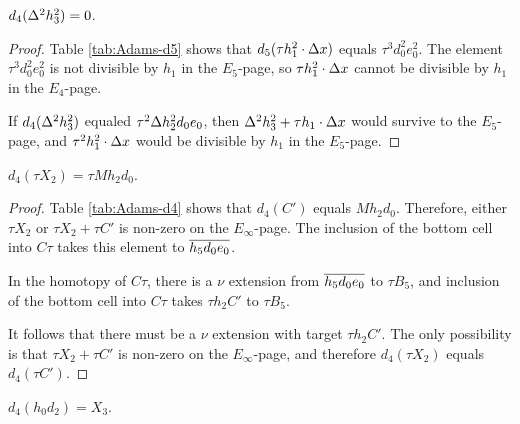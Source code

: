 \begin{lemma}
\label{lem:d4-D^2h3^2}
$d_4(\Delta^2 h_3^2) = 0$.
\end{lemma}

\begin{proof}
Table \ref{tab:Adams-d5} shows that 
$d_5(\tau h_1^2 \cdot \Delta x)$ equals
$\tau^3 d_0^2 e_0^2$.  
The element $\tau^3 d_0^2 e_0^2$ is not divisible by
$h_1$ in the $E_5$-page, so
$\tau h_1^2 \cdot \Delta x$ 
cannot be divisible by $h_1$ in the $E_4$-page.

If $d_4(\Delta^2 h_3^2)$ equaled 
$\tau^2 \Delta h_2^2 d_0 e_0$, then
$\Delta^2 h_3^2 + \tau h_1 \cdot \Delta x$ would survive to the $E_5$-page, 
and $\tau^2 h_1^2 \cdot \Delta x$ would be divisible by $h_1$ in the $E_5$-page.
\end{proof}

\begin{lemma}
\label{lem:d4-tX2}
$d_4(\tau X_2) = \tau M h_2 d_0$.
\end{lemma}

\begin{proof}
Table \ref{tab:Adams-d4} shows that $d_4(C')$ equals $M h_2 d_0$.
Therefore, either $\tau X_2$ or $\tau X_2 + \tau C'$ is non-zero on the
$E_\infty$-page.  The inclusion of the bottom cell into $C\tau$
takes this element to $\overline{h_5 d_0 e_0}$.

In the homotopy of $C\tau$, there is a $\nu$ extension from
$\overline{h_5 d_0 e_0}$ to $\tau B_5$, and
inclusion of the bottom cell into $C\tau$ takes
$\tau h_2 C'$ to $\tau B_5$.

It follows that there must be a $\nu$ extension with target
$\tau h_2 C'$.  The only possibility is that
$\tau X_2 + \tau C'$ is non-zero on the $E_\infty$-page,
and therefore $d_4(\tau X_2)$ equals $d_4(\tau C')$.
\end{proof}

\begin{lemma}
\label{lem:d4-h0d2}
$d_4(h_0 d_2) = X_3$.
\end{lemma}

